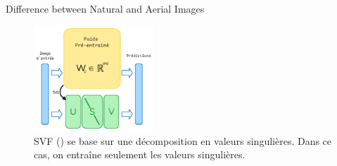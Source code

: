\begin{subsectionframemod}{Difference between Natural and Aerial Images}

    \begin{figure}
        \includegraphics[width=0.4\textwidth]{Figures/svf.png}
        \caption{SVF (\cite{sun2022singular}) se base sur une décomposition en valeurs singulières. Dans ce cas, on entraîne seulement les valeurs singulières.}
    \end{figure}


\end{subsectionframemod}